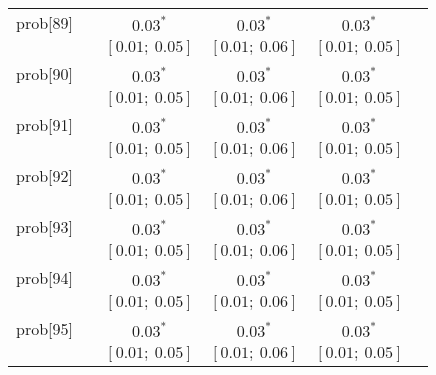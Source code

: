 \begin{table}
\begin{center}
\begin{tabular}{l c c c c c }
prob[89]    &                                  & $0.03^{*}$                & $0.03^{*}$                & $0.03^{*}$              &                         \\
            &                                  & $[0.01;\ 0.05]$           & $[0.01;\ 0.06]$           & $[0.01;\ 0.05]$         &                         \\
prob[90]    &                                  & $0.03^{*}$                & $0.03^{*}$                & $0.03^{*}$              &                         \\
            &                                  & $[0.01;\ 0.05]$           & $[0.01;\ 0.06]$           & $[0.01;\ 0.05]$         &                         \\
prob[91]    &                                  & $0.03^{*}$                & $0.03^{*}$                & $0.03^{*}$              &                         \\
            &                                  & $[0.01;\ 0.05]$           & $[0.01;\ 0.06]$           & $[0.01;\ 0.05]$         &                         \\
prob[92]    &                                  & $0.03^{*}$                & $0.03^{*}$                & $0.03^{*}$              &                         \\
            &                                  & $[0.01;\ 0.05]$           & $[0.01;\ 0.06]$           & $[0.01;\ 0.05]$         &                         \\
prob[93]    &                                  & $0.03^{*}$                & $0.03^{*}$                & $0.03^{*}$              &                         \\
            &                                  & $[0.01;\ 0.05]$           & $[0.01;\ 0.06]$           & $[0.01;\ 0.05]$         &                         \\
prob[94]    &                                  & $0.03^{*}$                & $0.03^{*}$                & $0.03^{*}$              &                         \\
            &                                  & $[0.01;\ 0.05]$           & $[0.01;\ 0.06]$           & $[0.01;\ 0.05]$         &                         \\
prob[95]    &                                  & $0.03^{*}$                & $0.03^{*}$                & $0.03^{*}$              &                         \\
            &                                  & $[0.01;\ 0.05]$           & $[0.01;\ 0.06]$           & $[0.01;\ 0.05]$         &                         \\

\end{tabular}
\end{center}
\end{table}
